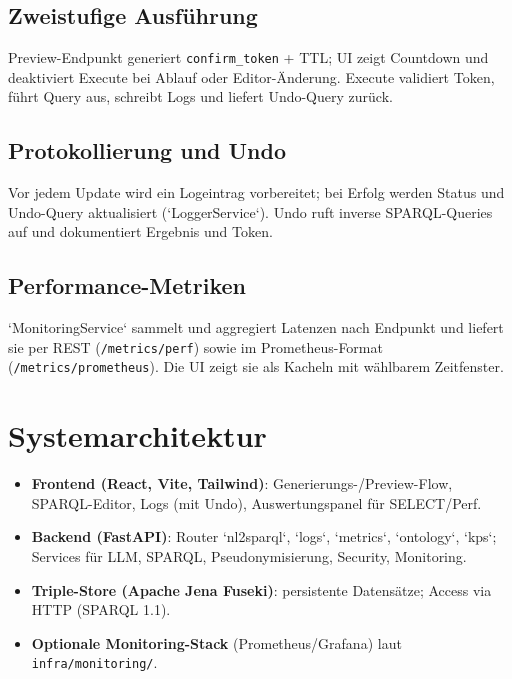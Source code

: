 \subsection{Zweistufige Ausführung}
Preview-Endpunkt generiert \texttt{confirm\_token} + TTL; UI zeigt Countdown und deaktiviert Execute bei Ablauf oder Editor-Änderung. Execute validiert Token, führt Query aus, schreibt Logs und liefert Undo-Query zurück.

\subsection{Protokollierung und Undo}
Vor jedem Update wird ein Logeintrag vorbereitet; bei Erfolg werden Status und Undo-Query aktualisiert (`LoggerService`). Undo ruft inverse SPARQL-Queries auf und dokumentiert Ergebnis und Token.

\subsection{Performance-Metriken}
`MonitoringService` sammelt und aggregiert Latenzen nach Endpunkt und liefert sie per REST (\texttt{/metrics/perf}) sowie im Prometheus-Format (\texttt{/metrics/prometheus}). Die UI zeigt sie als Kacheln mit wählbarem Zeitfenster.

\section{Systemarchitektur}
\label{subsec:arch-backend}
\begin{itemize}
  \item \textbf{Frontend (React, Vite, Tailwind)}: Generierungs-/Preview-Flow, SPARQL-Editor, Logs (mit Undo), Auswertungspanel für SELECT/Perf.
  \item \textbf{Backend (FastAPI)}: Router `nl2sparql`, `logs`, `metrics`, `ontology`, `kps`; Services für LLM, SPARQL, Pseudonymisierung, Security, Monitoring.
  \item \textbf{Triple-Store (Apache Jena Fuseki)}: persistente Datensätze; Access via HTTP (SPARQL 1.1).
  \item \textbf{Optionale Monitoring-Stack} (Prometheus/Grafana) laut \texttt{infra/monitoring/}.
\end{itemize}

